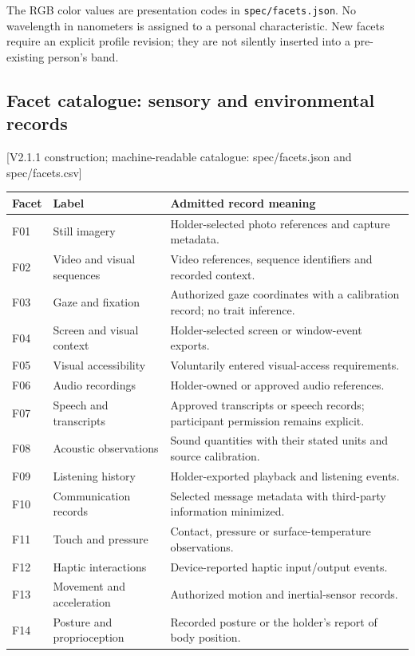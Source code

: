 \documentclass[11pt,a4paper]{article}
\newcommand{\newpagehead}[1]{\clearpage\subsection{#1}}
\newcommand{\source}[1]{{\sffamily\small\color{slate}[#1]}}
\begin{document}
The RGB color values are presentation codes in \texttt{spec/facets.json}. No wavelength in nanometers is assigned to a personal characteristic. New facets require an explicit profile revision; they are not silently inserted into a pre-existing person's band.

\newpagehead{Facet catalogue: sensory and environmental records}
\source{V2.1.1 construction; machine-readable catalogue: spec/facets.json and spec/facets.csv}
\begin{center}\small\begin{tabularx}{\textwidth}{@{}p{}p{}X@{}}\toprule
\textbf{Facet} & \textbf{Label} & \textbf{Admitted record meaning}\\\midrule
F01 & Still imagery & Holder-selected photo references and capture metadata.\\[5pt]
F02 & Video and visual sequences & Video references, sequence identifiers and recorded context.\\[5pt]
F03 & Gaze and fixation & Authorized gaze coordinates with a calibration record; no trait inference.\\[5pt]
F04 & Screen and visual context & Holder-selected screen or window-event exports.\\[5pt]
F05 & Visual accessibility & Voluntarily entered visual-access requirements.\\\midrule
F06 & Audio recordings & Holder-owned or approved audio references.\\[5pt]
F07 & Speech and transcripts & Approved transcripts or speech records; participant permission remains explicit.\\[5pt]
F08 & Acoustic observations & Sound quantities with their stated units and source calibration.\\[5pt]
F09 & Listening history & Holder-exported playback and listening events.\\[5pt]
F10 & Communication records & Selected message metadata with third-party information minimized.\\\midrule
F11 & Touch and pressure & Contact, pressure or surface-temperature observations.\\[5pt]
F12 & Haptic interactions & Device-reported haptic input/output events.\\[5pt]
F13 & Movement and acceleration & Authorized motion and inertial-sensor records.\\[5pt]
F14 & Posture and proprioception & Recorded posture or the holder's report of body position.\\[5pt]

\end{tabularx}
\end{center}
\end{document}

